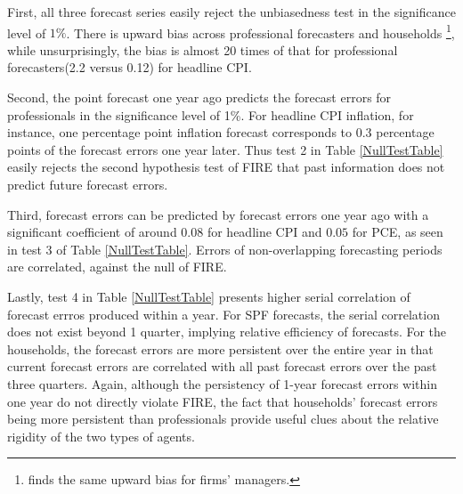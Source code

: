 \documentclass[]{article}
\begin{document}
	First,  all three forecast series easily reject the unbiasedness test in the significance level of $1\%$. There is upward bias across professional forecasters and households \footnote{\citet{coibion2018firms} finds the same upward bias for firms' managers.}, while unsurprisingly, the bias is almost 20 times of that for professional forecasters(2.2 versus 0.12) for headline CPI. 
	
	Second, the point forecast one year ago predicts the forecast errors for professionals in the significance level of 1\%. For headline CPI inflation, for instance, one percentage point inflation forecast corresponds to 0.3 percentage points of the forecast errors one year later. Thus test 2 in Table \ref{NullTestTable} easily rejects the second hypothesis test of FIRE that past information does not predict future forecast errors. 
	
	Third, forecast errors can be predicted by forecast errors one year ago with a significant coefficient of around $0.08$ for headline CPI and $0.05$ for PCE, as seen in test 3 of Table \ref{NullTestTable}. Errors of non-overlapping forecasting periods are correlated, against the null of FIRE. 
	
	Lastly, test 4 in Table \ref{NullTestTable} presents higher serial correlation of forecast errros produced within a year. For SPF forecasts, the serial correlation does not exist beyond 1 quarter, implying relative efficiency of forecasts. For the households, the forecast errors are more persistent over the entire year in that current forecast errors are correlated with all past forecast errors over the past three quarters.  Again, although the persistency of 1-year forecast errors within one year do not directly violate FIRE, the fact that households' forecast errors being more persistent than professionals provide useful clues about the relative rigidity of the two types of agents. 
	
\end{document}
